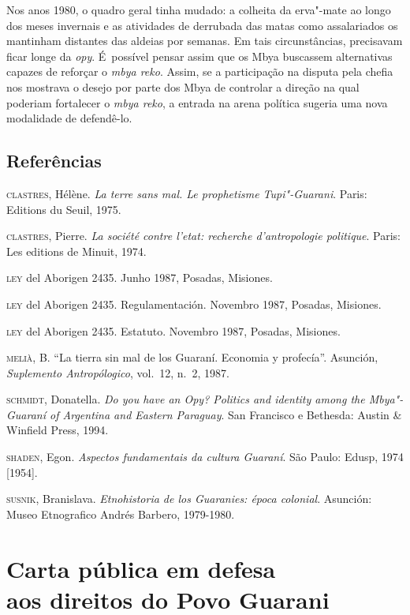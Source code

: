 Nos anos 1980, o quadro geral tinha mudado: a colheita da erva"-mate ao
longo dos meses invernais e as atividades de derrubada das matas como
assalariados os mantinham distantes das aldeias por semanas. Em tais
circunstâncias, precisavam ficar longe da \emph{opy}. É~possível pensar assim
que os Mbya buscassem alternativas capazes de reforçar o \emph{mbya reko}.
Assim, se a participação na disputa pela chefia nos mostrava o desejo
por parte dos Mbya de controlar a direção na qual poderiam fortalecer o
\emph{mbya reko}, a entrada na arena política sugeria uma nova modalidade de
defendê-lo. 

\section{Referências}

\begin{Parskip}
\textsc{clastres}, Hélène. \emph{La terre sans mal. Le prophetisme Tupi"-Guarani}. Paris:
Editions du Seuil, 1975.

\textsc{clastres}, Pierre. \emph{La société contre l’etat: recherche d’antropologie
politique}. Paris: Les editions de Minuit, 1974.

\textsc{ley} del Aborigen 2435. Junho 1987, Posadas, Misiones.

\textsc{ley} del Aborigen 2435. Regulamentación. Novembro 1987, Posadas,
Misiones.

\textsc{ley} del Aborigen 2435. Estatuto. Novembro 1987, Posadas, Misiones.

\textsc{melià}, B. ``La tierra sin mal de los Guaraní. Economia y profecía''.
Asunción, \emph{Suplemento Antropólogico}, vol.~12, n.~2, 1987.

\textsc{schmidt}, Donatella. \emph{Do you have an \emph{Opy}? Politics and identity among the
Mbya"-Guaraní of Argentina and Eastern Paraguay}. San Francisco e
Bethesda: Austin \& Winfield Press, 1994.

\textsc{shaden}, Egon. \emph{Aspectos fundamentais da cultura Guaraní}. São Paulo:
Edusp, 1974 [1954].

\textsc{susnik}, Branislava. \emph{Etnohistoria de los Guaranies: época colonial}.
Asunción: Museo Etnografico Andrés Barbero, 1979-1980.
\end{Parskip}

\chapter*{Carta pública em defesa\\ aos direitos do Povo Guarani}

